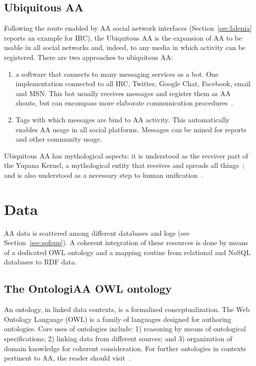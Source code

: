 \documentclass[12pt,fleqn]{article}
\begin{document}
\subsection{Ubiquitous AA}\label{sec:ubi}
Following the route enabled by AA social network interfaces (Section~\ref{sec:lalenia} reports an example for IRC),
the Ubiquitous AA is the expansion of AA to be usable in all social networks and, indeed,
to any media in which activity can be registered.
There are two approaches to ubiquitous AA:
\begin{enumerate}
    \item a software that connects to many messaging services as a bot.
	    One implementation connected to all IRC, Twitter, Google Chat, Facebook, email and MSN.
		This bot usually receives messages and register them as AA shouts,
		but can encompass more elaborate communication procedures~\citep{ubi}.
    \item Tags with which messages are bind to AA activity.
	    This automatically enables AA usage in all social platforms.
		Messages can be mined for reports and other community usage.
\end{enumerate}

Ubiquitous AA has mythological aspects:
it is understood as the receiver part of the Yupana Kernel,
a mythological entity that receives and spreads all things~\citep{yupana};
and is also understood as a necessary step to human unification~\citep{wisaa,ciberiun}.

\section{Data}\label{sec:data}
AA data is scattered among different databases and logs (see Section~\ref{sec:sofsup}).
A coherent integration of these resources is done by means of a dedicated OWL ontology
and a mapping routine from relational and NoSQL databases to RDF data.

\subsection{The OntologiAA OWL ontology}\label{sec:ont}
An ontology, in linked data contexts, is a formalized conceptualization.
The Web Ontology Language (OWL) is a family of languages designed for authoring ontologies.
Core uses of ontologies include: 1) reasoning by means of ontological specifications;
2) linking data from different sources; and 3) organization of domain knowledge for coherent consideration.
For further ontologies in contexts pertinent to AA, the reader should visit~\cite{ops,pnud5}.
\end{document}
